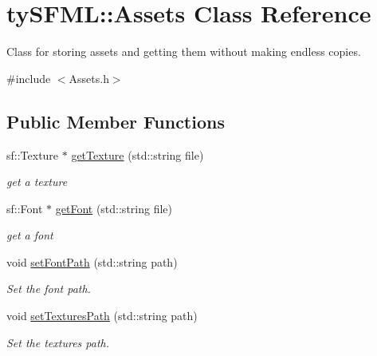 \hypertarget{classty_s_f_m_l_1_1_assets}{}\section{ty\+S\+F\+M\+L\+:\+:Assets Class Reference}
\label{classty_s_f_m_l_1_1_assets}


Class for storing assets and getting them without making endless copies.  




{\ttfamily \#include $<$Assets.\+h$>$}

\subsection*{Public Member Functions}
\begin{DoxyCompactItemize}
\item 
sf\+::\+Texture $\ast$ \hyperlink{classty_s_f_m_l_1_1_assets_adf011f22e1001c363815014a4a132670}{get\+Texture} (std\+::string file)
\begin{DoxyCompactList}\small\item\em get a texture \end{DoxyCompactList}\item 
sf\+::\+Font $\ast$ \hyperlink{classty_s_f_m_l_1_1_assets_a3f20804bb69de705d9b97753883d4ddf}{get\+Font} (std\+::string file)
\begin{DoxyCompactList}\small\item\em get a font \end{DoxyCompactList}\item 
\hypertarget{classty_s_f_m_l_1_1_assets_af9fed0fce48bb1ea79fff813ffb58e8f}{}void \hyperlink{classty_s_f_m_l_1_1_assets_af9fed0fce48bb1ea79fff813ffb58e8f}{set\+Font\+Path} (std\+::string path)\label{classty_s_f_m_l_1_1_assets_af9fed0fce48bb1ea79fff813ffb58e8f}

\begin{DoxyCompactList}\small\item\em Set the font path. \end{DoxyCompactList}\item 
\hypertarget{classty_s_f_m_l_1_1_assets_a36a8eceb572416fa5584b5f3ecd0d8c6}{}void \hyperlink{classty_s_f_m_l_1_1_assets_a36a8eceb572416fa5584b5f3ecd0d8c6}{set\+Textures\+Path} (std\+::string path)\label{classty_s_f_m_l_1_1_assets_a36a8eceb572416fa5584b5f3ecd0d8c6}

\begin{DoxyCompactList}\small\item\em Set the textures path. \end{DoxyCompactList}\end{DoxyCompactItemize}
